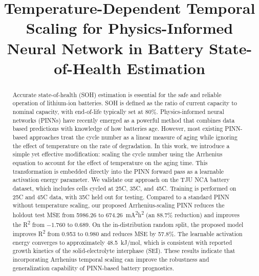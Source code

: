 \documentclass[conference]{IEEEtran}
\begin{document}
\title{Temperature-Dependent Temporal Scaling for Physics-Informed Neural Network in Battery State-of-Health Estimation}

\author{

}

\maketitle
    
\begin{abstract}
Accurate state-of-health (SOH) estimation is essential for the safe and reliable operation of lithium-ion batteries. SOH is defined as the ratio of current capacity to nominal capacity, with end-of-life typically set at 80\%. Physics-informed neural networks (PINNs) have recently emerged as a powerful method that combines data based predictions with knowledge of how batteries age. However, most existing PINN-based approaches treat the cycle number as a linear measure of aging while ignoring the effect of temperature on the rate of degradation. In this work, we introduce a simple yet effective modification: scaling the cycle number using the Arrhenius equation to account for the effect of temperature on the aging time. This transformation is embedded directly into the PINN forward pass as a learnable activation energy parameter. We validate our approach on the TJU NCA battery dataset, which includes cells cycled at 25\textdegree C, 35\textdegree C, and 45\textdegree C. Training is performed on 25\textdegree C and 45\textdegree C data, with 35\textdegree C held out for testing. Compared to a standard PINN without temperature scaling, our proposed Arrhenius-scaling PINN reduces the holdout test MSE from 5986.26 to 674.26~mA\textsuperscript{2}\textperiodcentered h\textsuperscript{2} (an 88.7\% reduction) and improves the R\textsuperscript{2} from $-1.760$ to $0.689$. On the in-distribution random split, the proposed model improves R\textsuperscript{2} from 0.953 to 0.980 and reduces MSE by 57.8\%. The learnable activation energy converges to approximately 48.5~kJ/mol, which is consistent with reported growth kinetics of the solid-electrolyte interphase (SEI). These results indicate that incorporating Arrhenius temporal scaling can improve the robustness and generalization capability of PINN-based battery prognostics.
\end{abstract}
\end{document}

